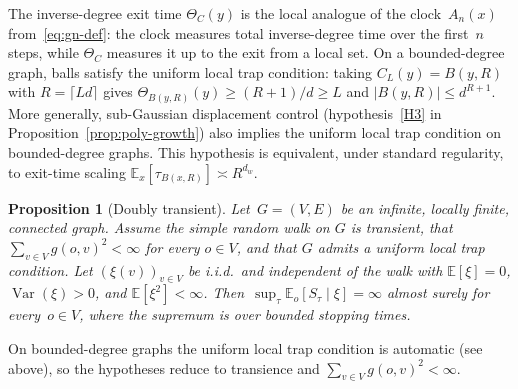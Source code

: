 \documentclass[aop]{imsart}
\theoremstyle{plain}
\newtheorem{proposition}[theorem]{Proposition}
\theoremstyle{definition}
\newcommand{\E}{\mathbb{E}}
\DeclareMathOperator{\var}{Var}
\begin{document}
	The inverse-degree exit time $\Theta_C(y)$ is the local analogue of the clock~$A_n(x)$ from~\eqref{eq:gn-def}: the clock measures total inverse-degree time over the first~$n$ steps, while $\Theta_C$ measures it up to the exit from a local set. On a bounded-degree graph, balls satisfy the uniform local trap condition: taking $C_L(y)=B(y,R)$ with $R=\lceil Ld\rceil$ gives $\Theta_{B(y,R)}(y)\geq(R+1)/d\geq L$ and $|B(y,R)|\leq d^{R+1}$. More generally, sub-Gaussian displacement control (hypothesis~\ref{H3} in Proposition~\ref{prop:poly-growth}) also implies the uniform local trap condition on bounded-degree graphs. This hypothesis is equivalent, under standard regularity, to exit-time scaling $\E_x[\tau_{B(x,R)}]\asymp R^{d_w}$.
	
	\begin{proposition}[Doubly transient]\label{prop:doubly-transient-really-general}
		Let~$G = (V,E)$ be an infinite, locally finite, connected graph. Assume the simple random walk on $G$ is transient, that $\sum_{v\in V}g(o,v)^2<\infty$ for every $o\in V$,
		and that $G$ admits a uniform local trap condition.
		Let $(\xi(v))_{v\in V}$ be i.i.d.\ and independent of the walk with $\E[\xi]=0$, $\var(\xi)>0$, and $\E[\xi^2]<\infty$. Then~$\sup_{\tau}\E_o[S_\tau\mid\xi]=\infty$ almost surely for every~$o\in V$, where the supremum is over bounded stopping times.
	\end{proposition}
	
	On bounded-degree graphs the uniform local trap condition is automatic (see above), so the hypotheses reduce to transience and $\sum_{v\in V} g(o,v)^2<\infty$.
	
\end{document}

